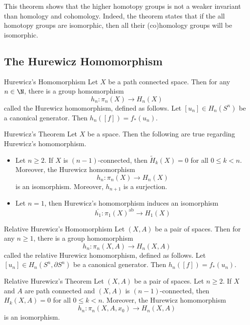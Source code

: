 \documentclass[a4paper]{article}
\begin{document}
This theorem shows that the higher homotopy groups is not a weaker invariant than homology and cohomology. Indeed, the theorem states that if the all homotopy groups are isomorphic, then all their (co)homology groups will be isomorphic. 


\subsection{The Hurewicz Homomorphism}
\begin{thm}{Hurewicz's Homomorphism}{} Let $X$ be a path connected space. Then for any $n\in\N$, there is a group homomorphism $$h_n:\pi_n(X)\to H_n(X)$$ called the Hurewicz homomorphism, defined as follows. Let $[u_n]\in H_n(S^n)$ be a canonical generator. Then $h_n([f])=f_\ast(u_n)$. 
\end{thm}

\begin{thm}{Hurewicz's Theorem}{} Let $X$ be a space. Then the following are true regarding Hurewicz's homomorphism. 
\begin{itemize}
\item Let $n\geq 2$. If $X$ is $(n-1)$-connected, then $\widetilde{H}_k(X)=0$ for all $0\leq k<n$. Moreover, the Hurewicz homomorphism $$h_n:\pi_n(X)\to H_n(X)$$ is an isomorphism. Moreover, $h_{n+1}$ is a surjection. 
\item Let $n=1$, then Hurewicz's homomorphism induces an isomorphism $$\overline{h_1}:\pi_1(X)^\text{ab}\to H_1(X)$$ 
\end{itemize}
\end{thm}

\begin{thm}{Relative Hurewicz's Homomorphism}{} Let $(X,A)$ be a pair of spaces. Then for any $n\geq 1$, there is a group homomorphism $$h_n:\pi_n(X,A)\to H_n(X,A)$$ called the relative Hurewicz homomorphism, defined as follows. Let $[u_n]\in H_n(S^n,\partial S^n)$ be a canonical generator. Then $h_n([f])=f_\ast(u_n)$. 
\end{thm}

\begin{thm}{Relative Hurewicz's Theorem}{} Let $(X,A)$ be a pair of spaces. Let $n\geq 2$. If $X$ and $A$ are path connected and $(X,A)$ is $(n-1)$-connected, then $H_k(X,A)=0$ for all $0\leq k<n$. Moreover, the Hurewicz homomorphism $$h_n:\pi_n(X,A,x_0)\to H_n(X,A)$$ is an isomorphism. 
\end{thm}
\end{document}
